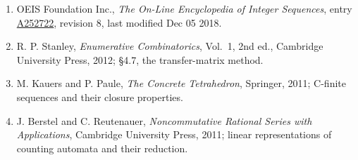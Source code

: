 \documentclass[11pt]{article}
\theoremstyle{definition}
\begin{document}
\begin{enumerate}

\item OEIS Foundation Inc., \emph{The On-Line Encyclopedia of Integer Sequences}, entry \href{https://oeis.org/A252722}{A252722}, revision 8, last modified Dec 05 2018.

\item R. P. Stanley, \emph{Enumerative Combinatorics}, Vol.~1, 2nd ed., Cambridge University Press, 2012; \S4.7, the transfer-matrix method.

\item M. Kauers and P. Paule, \emph{The Concrete Tetrahedron}, Springer, 2011; C-finite sequences and their closure properties.

\item J. Berstel and C. Reutenauer, \emph{Noncommutative Rational Series with Applications}, Cambridge University Press, 2011; linear representations of counting automata and their reduction.

\end{enumerate}
\end{document}
